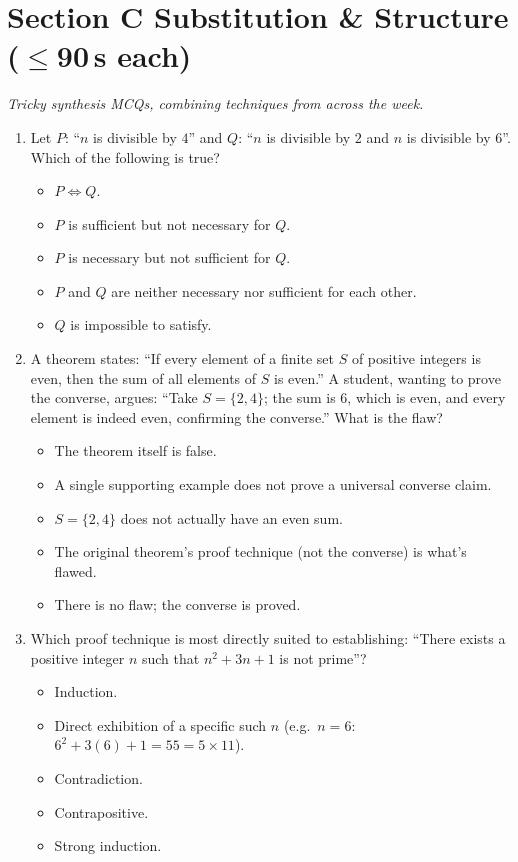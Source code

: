 \documentclass[11pt,a4paper]{article}
\begin{document}
\section*{Section C \quad Substitution \& Structure \hfill{\normalfont\small($\leq$90\,s each)}}

\noindent\textit{Tricky synthesis MCQs, combining techniques from across the week.}

\begin{enumerate}

\item Let $P$: ``$n$ is divisible by $4$'' and $Q$: ``$n$ is divisible by $2$ and $n$ is divisible by $6$''. Which of the following is true?
\begin{itemize}
\item[A)] $P\iff Q$.
\item[B)] $P$ is sufficient but not necessary for $Q$.
\item[C)] $P$ is necessary but not sufficient for $Q$.
\item[D)] $P$ and $Q$ are neither necessary nor sufficient for each other.
\item[E)] $Q$ is impossible to satisfy.
\end{itemize}

\item A theorem states: ``If every element of a finite set $S$ of positive integers is even, then the sum of all elements of $S$ is even.'' A student, wanting to prove the converse, argues: ``Take $S=\{2,4\}$; the sum is $6$, which is even, and every element is indeed even, confirming the converse.'' What is the flaw?
\begin{itemize}
\item[A)] The theorem itself is false.
\item[B)] A single supporting example does not prove a universal converse claim.
\item[C)] $S=\{2,4\}$ does not actually have an even sum.
\item[D)] The original theorem's proof technique (not the converse) is what's flawed.
\item[E)] There is no flaw; the converse is proved.
\end{itemize}

\item Which proof technique is most directly suited to establishing: ``There exists a positive integer $n$ such that $n^2+3n+1$ is not prime''?
\begin{itemize}
\item[A)] Induction.
\item[B)] Direct exhibition of a specific such $n$ (e.g.\ $n=6$: $6^2+3(6)+1=55=5\times11$).
\item[C)] Contradiction.
\item[D)] Contrapositive.
\item[E)] Strong induction.
\end{itemize}


\end{enumerate}
\end{document}
